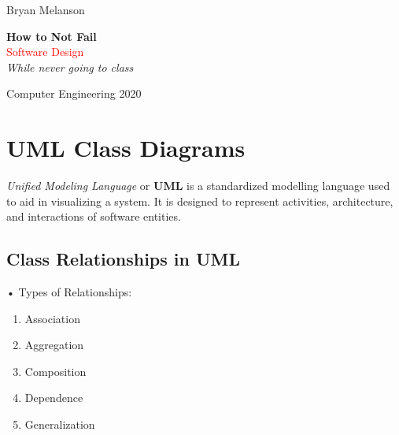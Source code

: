 \documentclass[11pt]{article}
\newcommand*{\plogo}{\fbox{$\mathcal{BM}$}}
\begin{document}
 
        
    \begin{titlepage}
    
        \raggedleft
        
        \vspace*{\baselineskip}
        
        {\Large Bryan Melanson}
        
        \vspace*{0.167\textheight}
        
        \textbf{\LARGE How to Not Fail}\\[\baselineskip]
        
        {\textcolor{Red}{\Huge Software Design}}\\[\baselineskip]
        
        {\Large \textit{While never going to class}}
        
        \vfill
        
        {\large Computer Engineering 2020 ~~\plogo}
        
        \vspace*{3\baselineskip}
    
    \end{titlepage}

    \pagebreak
    
\newcommand{\code}[1]{\texttt{#1}}

\tableofcontents

\pagebreak
\section{UML Class Diagrams}

\textit{Unified Modeling Language} or \textbf{UML} is a standardized modelling language used to aid in visualizing a system. It is designed to represent activities, architecture, and interactions of software entities.

\subsection{Class Relationships in UML}
• Types of Relationships:
\begin{enumerate}
    \item{Association}
    \item{Aggregation}
    \item{Composition}
    \item{Dependence}
    \item{Generalization}
\end{enumerate}
\end{document}
